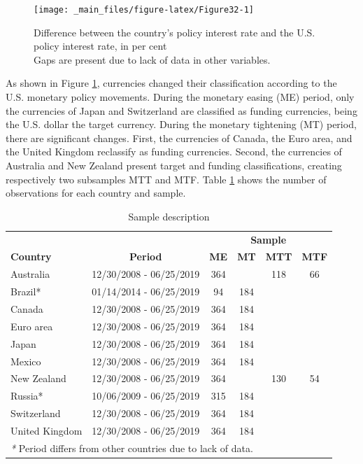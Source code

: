 \documentclass[a4paper, twoside]{templates/ociamthesis}
\begin{document}
\begin{figure}

{\centering \texttt{[image: \_main\_files/figure-latex/Figure32-1]} 

}

\caption[Difference between the country’s policy interest rate and the U.S. policy interest rate, in per cent]{Difference between the country’s policy interest rate and the U.S. policy interest rate, in per cent \\ \scriptsize *Gaps are present due to lack of data in other variables.}\label{fig:Figure32}
\end{figure}

As shown in Figure \ref{fig:Figure32}, currencies changed their classification according to the U.S. monetary policy movements. During the monetary easing (ME) period, only the currencies of Japan and Switzerland are classified as funding currencies, being the U.S. dollar the target currency. During the monetary tightening (MT) period, there are significant changes. First, the currencies of Canada, the Euro area, and the United Kingdom reclassify as funding currencies. Second, the currencies of Australia and New Zealand present target and funding classifications, creating respectively two subsamples MTT and MTF. Table \ref{tab:Table33} shows the number of observations for each country and sample.

\begin{table}

\caption{\label{tab:Table33}Sample description}
\centering
\fontsize{10}{12}\selectfont
\begin{tabular}[t]{lccccc}
\toprule
\multicolumn{2}{c}{\textbf{ }} & \multicolumn{4}{c}{\textbf{Sample}} \\
\cmidrule(l{3pt}r{3pt}){3-6}
\textbf{Country} & \textbf{Period} & \textbf{ME} & \textbf{MT} & \textbf{MTT} & \textbf{MTF}\\
\midrule
Australia & 12/30/2008 - 06/25/2019 & 364 &  & 118 & 66\\
Brazil* & 01/14/2014 - 06/25/2019 & 94 & 184 &  & \\
Canada & 12/30/2008 - 06/25/2019 & 364 & 184 &  & \\
Euro area & 12/30/2008 - 06/25/2019 & 364 & 184 &  & \\
Japan & 12/30/2008 - 06/25/2019 & 364 & 184 &  & \\
Mexico & 12/30/2008 - 06/25/2019 & 364 & 184 &  & \\
New Zealand & 12/30/2008 - 06/25/2019 & 364 &  & 130 & 54\\
Russia* & 10/06/2009 - 06/25/2019 & 315 & 184 &  & \\
Switzerland & 12/30/2008 - 06/25/2019 & 364 & 184 &  & \\
United Kingdom & 12/30/2008 - 06/25/2019 & 364 & 184 &  & \\
\bottomrule
\multicolumn{6}{l}{\rule{0pt}{1em}\textit{\footnotesize{*}} \footnotesize{Period differs from other countries due to lack of data.}}\\
\end{tabular}
\end{table}
\end{document}
